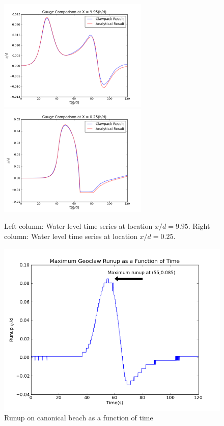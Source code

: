 \begin{figure}[ht]
\hfil\includegraphics[width=2.8in]{bp1/plotgauge2.png}\hfil
\hfil\includegraphics[width=2.8in]{bp1/plotgauge1.png}\hfil
\caption{\label{fig:bp1gauges} 
Left column: Water level time series at location $x/d = 9.95$.
Right column: Water level time series at location $x/d = 0.25$.
 }
\end{figure}

\begin{figure}[ht]
\hfil\includegraphics[width=5.5in]{bp1/runup.png}\hfil
\caption{\label{fig:bp1runup} 
Runup on canonical beach as a function of time}
\end{figure}

